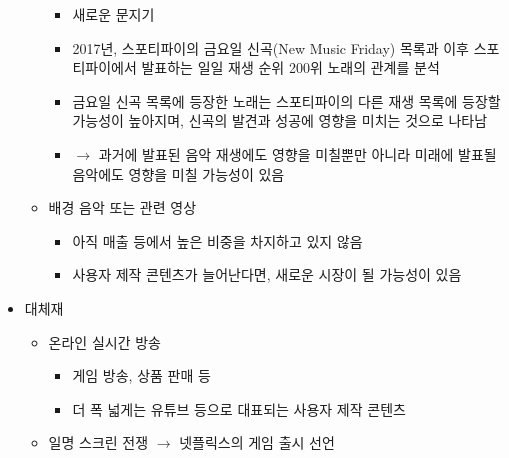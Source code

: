 \begin{itemize}
\begin{itemize}
		\begin{itemize}
		\item 새로운 문지기 \citep{Aguiar:2018ts,Aguiar:2021vb}
		\item 2017년, 스포티파이의 금요일 신곡(New Music Friday) 목록과 이후 스포티파이에서 발표하는 일일 재생 순위 200위 노래의 관계를 분석 
		\item 금요일 신곡 목록에 등장한 노래는 스포티파이의 다른 재생 목록에 등장할 가능성이 높아지며, 신곡의 발견과 성공에 영향을 미치는 것으로 나타남
		\item $\rightarrow$ 과거에 발표된 음악 재생에도 영향을 미칠뿐만 아니라 미래에 발표될 음악에도 영향을 미칠 가능성이 있음
		\end{itemize}
	\item 배경 음악 또는 관련 영상
		\begin{itemize}
		\item 아직 매출 등에서 높은 비중을 차지하고 있지 않음
		\item 사용자 제작 콘텐츠가 늘어난다면, 새로운 시장이 될 가능성이 있음
		\end{itemize}	
	\end{itemize}
\item 대체재
	\begin{itemize}
	\item 온라인 실시간 방송
		\begin{itemize}
		\item 게임 방송, 상품 판매 등
		\item 더 폭 넓게는 유튜브 등으로 대표되는 사용자 제작 콘텐츠
		\end{itemize}
	\item 일명 스크린 전쟁 $\rightarrow$ 넷플릭스의 게임 출시 선언
	\end{itemize}
\end{itemize}

\pagebreak

